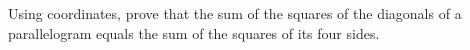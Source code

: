 Using coordinates, prove that the sum of the squares of the diagonals of a parallelogram equals the sum of the squares of its four sides.
